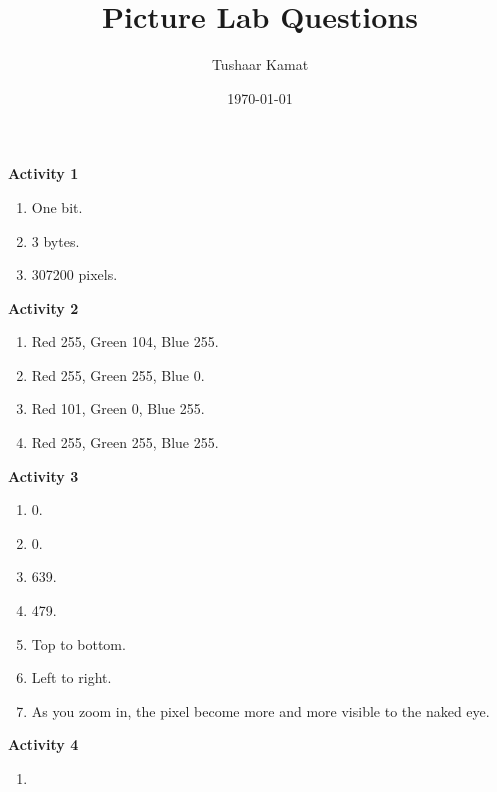 \documentclass{article}
\title{Picture Lab Questions}
\author{Tushaar Kamat}
\date{\today}
\begin{document}
\maketitle

\textbf{Activity 1}
\begin{enumerate}
  \item One bit. 
  \item 3 bytes.
  \item 307200 pixels. 
\end{enumerate}

\textbf{Activity 2}
\begin{enumerate}
  \item Red 255, Green 104, Blue 255. 
  \item Red 255, Green 255, Blue 0.
  \item Red 101, Green 0, Blue 255. 
  \item Red 255, Green 255, Blue 255.  
\end{enumerate}

\textbf{Activity 3}
\begin{enumerate}
  \item 0. 
  \item 0. 
  \item 639.     
  \item 479. 
  \item Top to bottom.  
  \item Left to right. 
  \item As you zoom in, the pixel become more and more visible to the naked
    eye. 
\end{enumerate}

\textbf{Activity 4}
\begin{enumerate}
  \item 
\end{enumerate}
\end{document}
